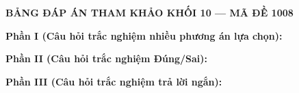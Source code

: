 
\newpage
\begin{center} \textbf{BẢNG ĐÁP ÁN THAM KHẢO KHỐI 10 --- MÃ ĐỀ 1008} \end{center}

\noindent \textbf{Phần I (Câu hỏi trắc nghiệm nhiều phương án lựa chọn):}  

\noindent \textbf{Phần II (Câu hỏi trắc nghiệm Đúng/Sai):}

\noindent \textbf{Phần III (Câu hỏi trắc nghiệm trả lời ngắn):}

\label{B\thedeso}